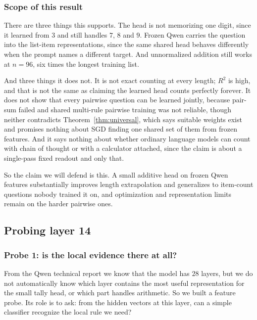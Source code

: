 \documentclass[10pt]{article}
\theoremstyle{definition}
\begin{document}
\subsubsection*{Scope of this result}

There are three things this supports. The head is not memorizing one digit, since it
learned from $3$ and still handles $7$, $8$ and $9$. Frozen Qwen carries the
question into the list-item representations, since the same shared head
behaves differently when the prompt names a different target. And
unnormalized addition still works at $n = 96$, six times the longest
training list.

And three things it does not. It is not exact counting at every length; $R^2$ is
high, and that is not the same as claiming the learned head counts
perfectly forever. It does not show that every pairwise question can be
learned jointly, because pair-sum failed and shared multi-rule pairwise
training was not reliable, though neither contradicts
Theorem~\ref{thm:universal}, which says suitable weights exist and promises
nothing about SGD finding one shared set of them from frozen features. And
it says nothing about whether ordinary language models can count with chain
of thought or with a calculator attached, since the claim is about a
single-pass fixed readout and only that.

So the claim we will defend is this. A small additive head on frozen Qwen
features substantially improves length extrapolation and generalizes to
item-count questions nobody trained it on, and optimization and
representation limits remain on the harder pairwise ones.

\subsection{Probing layer 14}
\label{sec:probe}

\subsubsection*{Probe 1: is the local evidence there at all?}

From the Qwen technical report \citep{qwen3} we know that the model has $28$ layers, but
we do not automatically know which layer contains the most useful
representation for the small tally head, or which part handles arithmetic.
So we built a feature probe. Its role is to ask: from the hidden vectors
at this layer, can a simple classifier recognize the local rule we need?
\end{document}

